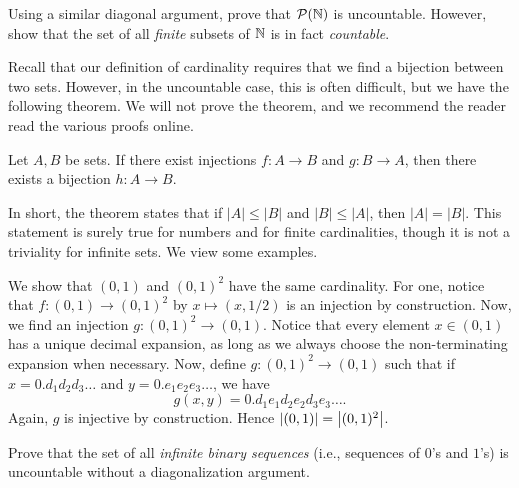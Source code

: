 \documentclass{article}
\begin{document}
\begin{exercise}
Using a similar diagonal argument, prove that $\mathcal P(\mathbb N)$ is uncountable. However, show that the set of all \textit{finite} subsets of $\mathbb N$ is in fact \textit{countable}.
\end{exercise}

Recall that our definition of cardinality requires that we find a bijection between two sets. However, in the uncountable case, this is often difficult, but we have the following theorem. We will not prove the theorem, and we recommend the reader read the various proofs online.
\begin{theorem}
Let $A,B$ be sets. If there exist injections $f: A\to B$ and $g: B\to A$, then there exists a bijection $h: A\to B$.
\end{theorem}
In short, the theorem states that if $|A| \leq |B|$ and $|B| \leq |A|$, then $|A| = |B|$. This statement is surely true for numbers and for finite cardinalities, though it is not a triviality for infinite sets. We view some examples.

\begin{example}
We show that $(0, 1)$ and $(0,1)^2$ have the same cardinality. For one, notice that $f: (0, 1)\to (0,1)^2$ by $x\mapsto (x, 1/2)$ is an injection by construction. Now, we find an injection $g: (0,1)^2\to (0,1)$. Notice that every element $x\in (0,1)$ has a unique decimal expansion, as long as we always choose the non-terminating expansion when necessary. Now, define $g: (0,1)^2 \to (0,1)$ such that if $x = 0.d_1d_2d_3\ldots$ and $y = 0.e_1e_2e_3\ldots$, we have
$$g(x,y) = 0.d_1e_1d_2e_2d_3e_3\ldots.$$
Again, $g$ is injective by construction. Hence $\left|(0,1)\right| = \left|(0,1)^2\right|$.
\end{example}

\begin{exercise}
Prove that the set of all \textit{infinite binary sequences} (i.e., sequences of $0$'s and $1$'s) is uncountable without a diagonalization argument.
\end{exercise}
\end{document}
